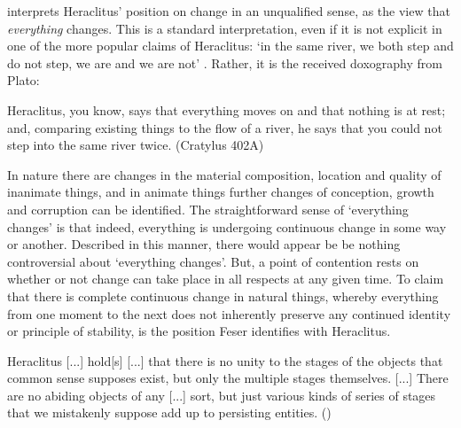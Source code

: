 \textcite[][13-20]{feser2019aristotle} interprets Heraclitus' position on change in an unqualified sense, as the view that \emph{everything} changes. This is a standard interpretation, even if it is not explicit in one of the more popular claims of Heraclitus: `in the same river, we both step and do not step, we are and we are not' \autocite[][29]{fitt1983ancilla}. Rather, it is the received doxography from Plato:
\begin{quoting}
Heraclitus, you know, says that everything moves on and that nothing is at rest; and, comparing existing things to the flow of a river, he says that you could not step into the same river twice. (Cratylus 402A)
\end{quoting}
In nature there are changes in the material composition, location and quality of inanimate things, and in animate things further changes of conception, growth and corruption can be identified. The straightforward sense of `everything changes' is that indeed, everything is undergoing continuous change in some way or another. Described in this manner, there would appear be be nothing controversial about `everything changes'. But, a point of contention rests on whether or not change can take place in all respects at any given time. To claim that there is complete continuous change in natural things, whereby everything from one moment to the next does not inherently preserve any continued identity or principle of stability, is the position Feser identifies with Heraclitus.
\begin{quoting}
Heraclitus [...] hold[s] [...] that there is no unity to the stages of the objects that common sense supposes exist, but only the multiple stages themselves. [...] There are no abiding objects of any [...] sort, but just various kinds of series of stages that we mistakenly suppose add up to persisting entities. (\citeyear[][17]{feser2019aristotle})
\end{quoting}

